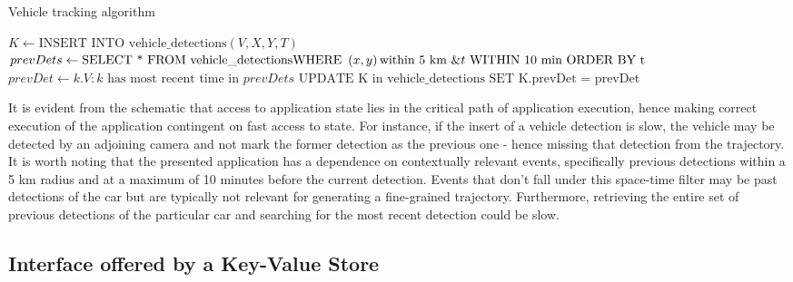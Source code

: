 \begin{algorithm}
\caption{Vehicle tracking algorithm}\label{usecasealgo}
\begin{algorithmic}[1]
\State $K \gets \text{INSERT INTO vehicle\_detections} \left(V, X, Y, T \right)$
\State $prevDets \gets \text{SELECT * FROM vehicle\_detections} \newline \text{WHERE } \left( x,y \right) \text{within 5 km } \& t \text{ WITHIN 10 min ORDER BY t }$
\State $prevDet \gets k.V : k \text{ has most recent time in } prevDets$
\State $\text{UPDATE K in vehicle\_detections SET K.prevDet = prevDet}$
\EndProcedure
\end{algorithmic}
\end{algorithm}
\par It is evident from the schematic that access to application state lies in the critical path of application execution, hence making correct execution of the application contingent on fast access to state. For instance, if the insert of a vehicle detection is slow, the vehicle may be detected by an adjoining camera and not mark the former detection as the previous one - hence missing that detection from the trajectory. It is worth noting that the presented application has a dependence on contextually relevant events, specifically previous detections within a 5 km radius and at a maximum of 10 minutes before the current detection. Events that don't fall under this space-time filter may be past detections of the car but are typically not relevant for generating a fine-grained trajectory. Furthermore, retrieving the entire set of previous detections of the particular car and searching for the most recent detection could be slow. 

\subsection{Interface offered by a Key-Value Store}
